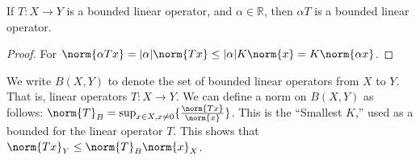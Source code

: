 \documentclass[crop=false,class=article,oneside]{standalone}
\begin{document}
            \begin{theorem}
                If $T:X\rightarrow{Y}$ is a bounded linear operator, and
                $\alpha\in\mathbb{R}$, then $\alpha{T}$ is a bounded
                linear operator.
            \end{theorem}
            \begin{proof}
                For
                $\norm{\alpha{Tx}}=|\alpha|\norm{Tx}%
                 \leq|\alpha|K\norm{x}=K\norm{\alpha{x}}$.
            \end{proof}
            We write $B(X,Y)$ to denote the set of bounded linear
            operators from $X$ to $Y$. That is, linear operators
            $T:X\rightarrow{Y}$.
            We can define a norm on $B(X,Y)$ as follows:
            $\norm{T}_{B}%
             =\sup_{x\in{X},x\ne{0}}\{\frac{\norm{Tx}}{\norm{x}}\}$.
            This is the ``Smallest $K$,'' used as a bounded for the linear
            operator $T$. This shows that
            $\norm{Tx}_{Y}\leq\norm{T}_{B}\norm{x}_{X}$.
\end{document}
